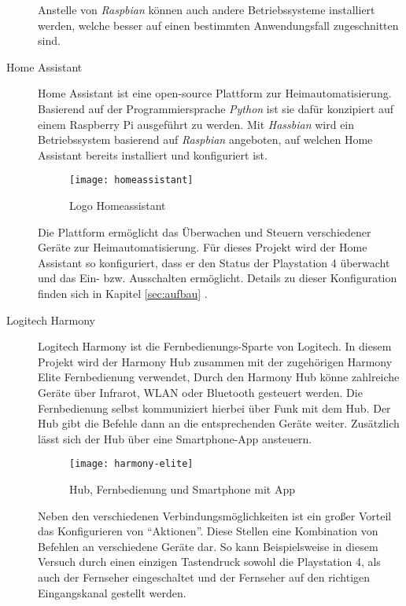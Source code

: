 \begin{description}
        Anstelle von \textit{Raspbian} können auch andere Betriebssysteme installiert werden,
        welche besser auf einen bestimmten Anwendungsfall zugeschnitten sind.

    \newpage

    \item[Home Assistant \cite{HomeAssi51:online}]
        Home Assistant ist eine open-source Plattform zur Heimautomatisierung.
        Basierend auf der Programmiersprache \textit{Python} ist sie dafür konzipiert
        auf einem Raspberry Pi ausgeführt zu werden.
        Mit \textit{Hassbian} wird ein Betriebssystem basierend auf \textit{Raspbian} angeboten,
        auf welchen Home Assistant bereits installiert und konfiguriert ist.

        \begin{figure}[h!]
            \centering
            \texttt{[image: homeassistant]}
            \caption{Logo Homeassistant}\label{fig:homeassistant}
        \end{figure}

        Die Plattform ermöglicht das Überwachen und Steuern verschiedener Geräte zur Heimautomatisierung.
        Für dieses Projekt wird der Home Assistant so konfiguriert,
        dass er den Status der Playstation 4 überwacht und das Ein- bzw. Ausschalten ermöglicht.
        Details zu dieser Konfiguration finden sich in Kapitel \ref{sec:aufbau} \textit{}.

    \newpage

    \item[Logitech Harmony \cite{HarmonyH15:online}]
        Logitech Harmony ist die Fernbedienungs-Sparte von Logitech.
        In diesem Projekt wird der Harmony Hub zusammen mit der zugehörigen Harmony Elite Fernbedienung verwendet,
        Durch den Harmony Hub könne zahlreiche Geräte über Infrarot, WLAN oder Bluetooth gesteuert werden.
        Die Fernbedienung selbst kommuniziert hierbei über Funk \cite{HowToPoi90:online} mit dem Hub.
        Der Hub gibt die Befehle dann an die entsprechenden Geräte weiter.
        Zusätzlich lässt sich der Hub über eine Smartphone-App ansteuern.

        \begin{figure}[h!]
            \centering
            \texttt{[image: harmony-elite]}
            \caption{Hub, Fernbedienung und Smartphone mit App}\label{fig:harmony}
        \end{figure}

        Neben den verschiedenen Verbindungsmöglichkeiten ist ein großer Vorteil das Konfigurieren von \enquote{Aktionen}.
        Diese Stellen eine Kombination von Befehlen an verschiedene Geräte dar.
        So kann Beispielsweise in diesem Versuch durch einen einzigen Tastendruck sowohl die Playstation 4,
        als auch der Fernseher eingeschaltet und der Fernseher auf den richtigen Eingangskanal gestellt werden.
\end{description}